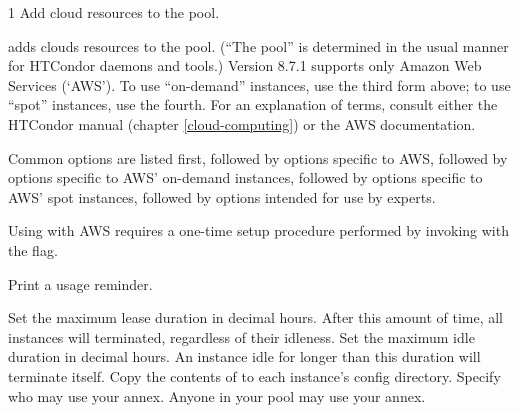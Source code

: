 \begin{ManPage}{\label{man-condor-annex}}{1}
{Add cloud resources to the pool.}

\Synopsis

 

 

 

 

\Description

 adds clouds resources to the pool.  (``The pool'' is determined
in the usual manner for HTCondor daemons and tools.)  Version 8.7.1 supports
only Amazon Web Services (`AWS').  To use ``on-demand'' instances, use
the third form above; to use ``spot'' instances, use the fourth.  For an
explanation of terms, consult either the HTCondor manual
(chapter \ref{cloud-computing}) or the AWS documentation.

Common options are listed first, followed by options specific to AWS,
followed by options specific to AWS' on-demand instances, followed by
options specific to AWS' spot instances, followed by options intended
for use by experts.

Using  with AWS requires a one-time setup procedure
performed by invoking  with the  flag.

\begin{Options}
		{Print a usage reminder.}

		{Set the maximum lease duration in decimal hours.  After this amount of time, all instances will terminated, regardless of their idleness.}
		{Set the maximum idle duration in decimal hours.  An instance idle for longer than this duration will terminate itself. }
		{Copy the contents of  to each instance's config directory.}
		{Specify who may use your annex.}
		{Anyone in your pool may use your annex.}


\end{Options}
\end{ManPage}
